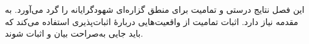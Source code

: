 \documentclass[../../../include/open-logic-chapter]{subfiles}
\begin{document}

\begin{editorial}
  این فصل نتایج درستی و تمامیت برای منطق گزاره‌ای شهودگرایانه را گرد
  می‌آورد. به مقدمه نیاز دارد. اثبات تمامیت از واقعیت‌هایی دربارهٔ
  اثبات‌پذیری استفاده می‌کند که باید جایی به‌صراحت بیان و اثبات شوند.
\end{editorial}


\OLEndChapterHook
\end{document}
